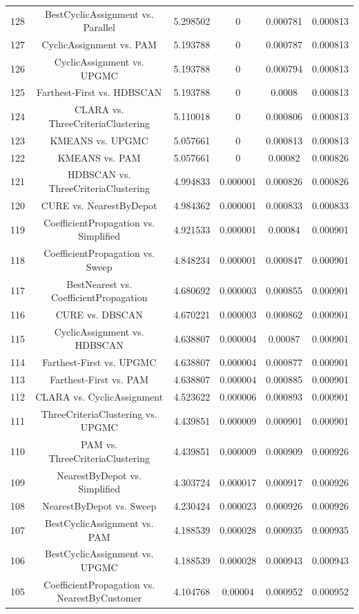 \documentclass[a4paper,10pt]{article}
\begin{document}
\begin{landscape}
\begin{table}[!htp]
\begin{tabular}{cccccc}
128&BestCyclicAssignment vs. Parallel&5.298502&0&0.000781&0.000813\\
127&CyclicAssignment vs. PAM&5.193788&0&0.000787&0.000813\\
126&CyclicAssignment vs. UPGMC&5.193788&0&0.000794&0.000813\\
125&Farthest-First vs. HDBSCAN&5.193788&0&0.0008&0.000813\\
124&CLARA vs. ThreeCriteriaClustering&5.110018&0&0.000806&0.000813\\
123&KMEANS vs. UPGMC&5.057661&0&0.000813&0.000813\\
122&KMEANS vs. PAM&5.057661&0&0.00082&0.000826\\
121&HDBSCAN vs. ThreeCriteriaClustering&4.994833&0.000001&0.000826&0.000826\\
120&CURE vs. NearestByDepot&4.984362&0.000001&0.000833&0.000833\\
119&CoefficientPropagation vs. Simplified&4.921533&0.000001&0.00084&0.000901\\
118&CoefficientPropagation vs. Sweep&4.848234&0.000001&0.000847&0.000901\\
117&BestNearest vs. CoefficientPropagation&4.680692&0.000003&0.000855&0.000901\\
116&CURE vs. DBSCAN&4.670221&0.000003&0.000862&0.000901\\
115&CyclicAssignment vs. HDBSCAN&4.638807&0.000004&0.00087&0.000901\\
114&Farthest-First vs. UPGMC&4.638807&0.000004&0.000877&0.000901\\
113&Farthest-First vs. PAM&4.638807&0.000004&0.000885&0.000901\\
112&CLARA vs. CyclicAssignment&4.523622&0.000006&0.000893&0.000901\\
111&ThreeCriteriaClustering vs. UPGMC&4.439851&0.000009&0.000901&0.000901\\
110&PAM vs. ThreeCriteriaClustering&4.439851&0.000009&0.000909&0.000926\\
109&NearestByDepot vs. Simplified&4.303724&0.000017&0.000917&0.000926\\
108&NearestByDepot vs. Sweep&4.230424&0.000023&0.000926&0.000926\\
107&BestCyclicAssignment vs. PAM&4.188539&0.000028&0.000935&0.000935\\
106&BestCyclicAssignment vs. UPGMC&4.188539&0.000028&0.000943&0.000943\\
105&CoefficientPropagation vs. NearestByCustomer&4.104768&0.00004&0.000952&0.000952\\

\end{tabular}
\end{table}
\end{landscape}
\end{document}
